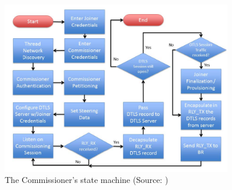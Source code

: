 \begin{figure}[!ht]
    \centering
    \includegraphics[width=100mm, keepaspectratio]{figures/commissioner-sm-Final_12639Thread_1.3.jpg}
    \caption{The Commissioner's state machine (Source: \cite{thread:130})}
    \label{fig:ot:commissioner-sm}
\end{figure}

